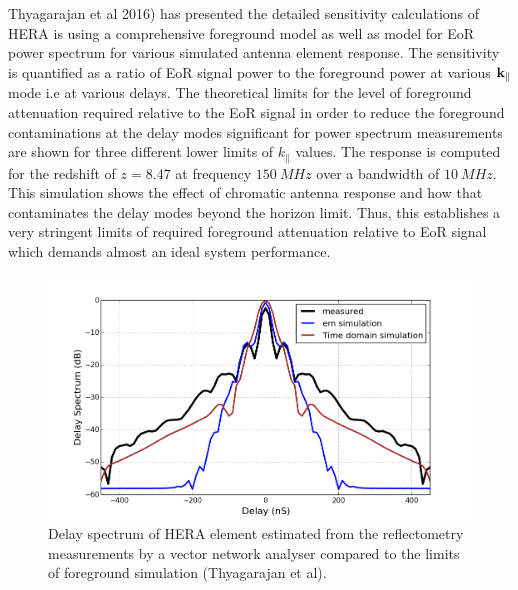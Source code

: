 \documentclass[twocolumn]{emulateapj}
\begin{document}
Thyagarajan et al 2016) has presented the detailed sensitivity calculations of HERA is using a comprehensive foreground model as well as model for EoR power spectrum for various simulated antenna element response. The sensitivity is quantified as a ratio of EoR signal power to the foreground power at various $\bold k_{\parallel}$ mode i.e at various delays. The theoretical limits for the level of foreground attenuation required relative to the EoR signal in order to reduce the foreground contaminations at the delay modes significant for power spectrum measurements are shown for three different lower limits of $k_\parallel$ values.  The response is computed for the redshift of $z=8.47$ at frequency $150~MHz$ over a bandwidth of $10~MHz$. This simulation shows the effect of chromatic antenna response and how that contaminates the delay modes beyond the horizon limit. Thus, this establishes a very stringent limits of required foreground attenuation relative to EoR signal which demands almost an ideal system performance. \\

\begin{figure}
\centering
\includegraphics[width=\linewidth]{GB_reflectometry_part3/plot/simulation_comparison.png}
\caption{Delay spectrum of HERA element estimated from the reflectometry measurements by a vector network analyser compared to the limits of foreground simulation (Thyagarajan et al).}
\label{fig:sim_fg_Nithya}
\end{figure}
\end{document}
